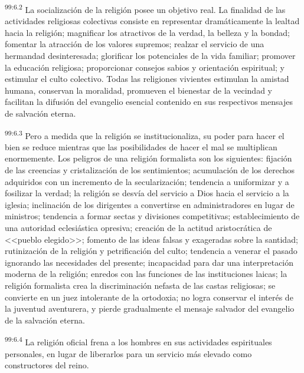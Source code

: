 \documentclass[twoside, 11pt]{book}
\begin{document}
\par
\textsuperscript{99:6.2} La socialización de la religión posee un objetivo real. La finalidad de las actividades religiosas colectivas consiste en representar dramáticamente la lealtad hacia la religión; magnificar los atractivos de la verdad, la belleza y la bondad; fomentar la atracción de los valores supremos; realzar el servicio de una hermandad desinteresada; glorificar los potenciales de la vida familiar; promover la educación religiosa; proporcionar consejos sabios y orientación espiritual; y estimular el culto colectivo. Todas las religiones vivientes estimulan la amistad humana, conservan la moralidad, promueven el bienestar de la vecindad y facilitan la difusión del evangelio esencial contenido en sus respectivos mensajes de salvación eterna.

\par
\textsuperscript{99:6.3} Pero a medida que la religión se institucionaliza, su poder para hacer el bien se reduce mientras que las posibilidades de hacer el mal se multiplican enormemente. Los peligros de una religión formalista son los siguientes: fijación de las creencias y cristalización de los sentimientos; acumulación de los derechos adquiridos con un incremento de la secularización; tendencia a uniformizar y a fosilizar la verdad; la religión se desvía del servicio a Dios hacia el servicio a la iglesia; inclinación de los dirigentes a convertirse en administradores en lugar de ministros; tendencia a formar sectas y divisiones competitivas; establecimiento de una autoridad eclesiástica opresiva; creación de la actitud aristocrática de <<pueblo elegido>>; fomento de las ideas falsas y exageradas sobre la santidad; rutinización de la religión y petrificación del culto; tendencia a venerar el pasado ignorando las necesidades del presente; incapacidad para dar una interpretación moderna de la religión; enredos con las funciones de las instituciones laicas; la religión formalista crea la discriminación nefasta de las castas religiosas; se convierte en un juez intolerante de la ortodoxia; no logra conservar el interés de la juventud aventurera, y pierde gradualmente el mensaje salvador del evangelio de la salvación eterna.

\par
\textsuperscript{99:6.4} La religión oficial frena a los hombres en sus actividades espirituales personales, en lugar de liberarlos para un servicio más elevado como constructores del reino.
\end{document}
